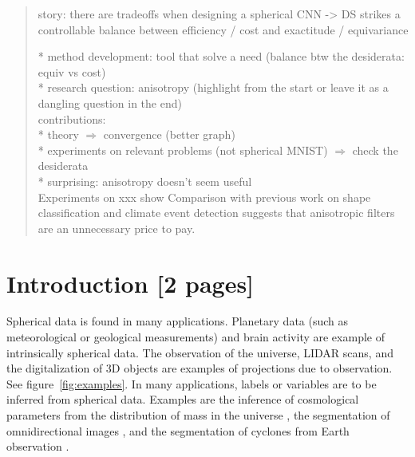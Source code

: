\documentclass{article} %
\renewcommand{\figref}[1]{figure~\ref{fig:#1}}
\begin{document}
\begin{abstract}

story: there are tradeoffs when designing a spherical CNN -> DS strikes a controllable balance between efficiency / cost and exactitude / equivariance

* method development: tool that solve a need (balance btw the desiderata: equiv vs cost)\\
* research question: anisotropy (highlight from the start or leave it as a dangling question in the end)\\

contributions:\\
* theory $\Rightarrow$ convergence (better graph)\\
* experiments on relevant problems (not spherical MNIST) $\Rightarrow$ check the desiderata\\
  * surprising: anisotropy doesn't seem useful\\

Experiments on xxx show
Comparison with previous work on shape classification and climate event detection suggests that anisotropic filters are an unnecessary price to pay.

\end{abstract}

\section{Introduction [2 pages]}

Spherical data is found in many applications.
Planetary data (such as meteorological or geological measurements) and brain activity are example of intrinsically spherical data.
The observation of the universe, LIDAR scans, and the digitalization of 3D objects are examples of projections due to observation.
See \figref{examples}.
In many applications, labels or variables are to be inferred from spherical data.
Examples are the inference of cosmological parameters from the distribution of mass in the universe \citep{perraudin2019deepspherecosmo}, the segmentation of omnidirectional images \citep{khasanova2017sphericalcnn}, and the segmentation of cyclones from Earth observation \citep{mudigonda2017climateevents}.
\end{document}
